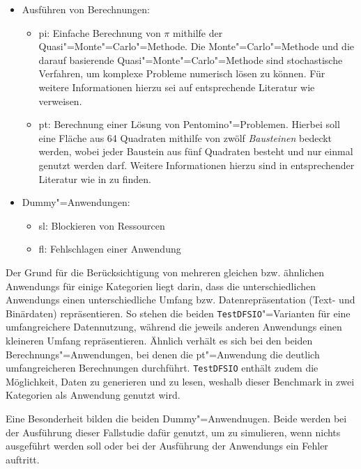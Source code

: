\begin{itemize}
    \item Ausführen von Berechnungen:
    \begin{itemize}
        \item \acrlong{pi}: Einfache Berechnung von $\pi$ mithilfe der Quasi"=Monte"=Carlo"=Methode.
            Die Monte"=Carlo"=Methode und die darauf basierende Quasi"=Monte"=Carlo"=Methode sind stochastische Verfahren, um komplexe Probleme numerisch lösen zu können.
            Für weitere Informationen hierzu sei auf entsprechende Literatur wie \zB \cite{Korn2010,Lemieux2009} verweisen.
        \item \gls{pt}: Berechnung einer Lösung von Pentomino"=Problemen.
            Hierbei soll eine Fläche aus 64 Quadraten mithilfe von zwölf \emph{Bausteinen} bedeckt werden, wobei jeder Baustein aus fünf Quadraten besteht und nur einmal genutzt werden darf.
            Weitere Informationen hierzu sind in entsprechender Literatur wie \zB in \cite{Golomb1995} zu finden.
    \end{itemize}

    \item Dummy"=Anwendungen:
    \begin{itemize}
        \item  \gls{sl}: Blockieren von Ressourcen
        \item  \gls{fl}: Fehlschlagen einer Anwendung
    \end{itemize}
\end{itemize}

Der Grund für die Berücksichtigung von mehreren gleichen bzw. ähnlichen \glspl{Anwendung} für einige Kategorien liegt darin, dass die unterschiedlichen \glspl{Anwendung} einen unterschiedliche Umfang bzw. Datenrepräsentation (Text- und Binärdaten) repräsentieren.
So stehen die beiden \texttt{TestDFSIO}"=Varianten für eine umfangreichere Datennutzung, während die jeweils anderen \glspl{Anwendung} einen kleineren Umfang repräsentieren.
Ähnlich verhält es sich bei den beiden Berechnungs"=Anwendungen, bei denen die \acrlong{pt}"=Anwendung die deutlich umfangreicheren Berechnungen durchführt.
\texttt{TestDFSIO} enthält zudem die Möglichkeit, Daten zu generieren und zu lesen, weshalb dieser Benchmark in zwei Kategorien als \gls{Anwendung} genutzt wird.

Eine Besonderheit bilden die beiden Dummy"=Anwendnugen.
Beide werden bei der Ausführung dieser Fallstudie dafür genutzt, um zu simulieren, wenn nichts ausgeführt werden soll oder bei der Ausführung der \glspl{Anwendung} ein Fehler auftritt.

